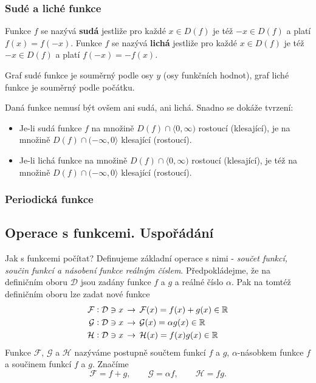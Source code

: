       \subsubsection{Sudé a liché funkce}
        \begin{definition}\label{MA1:def_lim04}
          Funkce $f$ se nazývá \textbf{sudá} jestliže pro každé $x\in D(f)$ je též $-x\in D(f)$  a 
          platí $f(x)=f(-x)$.
          Funkce $f$ se nazývá \textbf{lichá} jestliže pro každé $x\in D(f)$ je též $-x\in D(f)$  a 
          platí $f(-x)=-f(x)$. 
        \end{definition}
        Graf sudé funkce je souměrný podle osy $y$ (osy funkčních hodnot), graf liché funkce je  
        souměrný podle počátku. 
 
         

        Daná funkce nemusí být ovšem ani sudá, ani lichá. Snadno se dokáže tvrzení:
        \begin{itemize}[noitemsep]
          \item Je-li sudá funkce $f$ na množině $D(f)\cap\langle0,\infty)$ rostoucí (klesající),
                je na množině $D(f)\cap(-\infty,0\rangle$ klesající (rostoucí).
          \item Je-li lichá funkce na množině $D(f)\cap\langle0,\infty)$ rostoucí (klesající),
                je též na množině $D(f)\cap(-\infty,0\rangle$ klesající (rostoucí).                 
        \end{itemize}
      \subsubsection{Periodická funkce}

    \subsection{Operace s funkcemi. Uspořádání}\label{mai:IchapIIIsecIssecIV}
      Jak s funkcemi počítat? Definujeme základní operace s nimi - \emph{součet funkcí, součin 
      funkcí a násobení funkce reálným číslem}. Předpokládejme, že na definičním oboru 
      \(\mathcal{D}\) jsou zadány funkce \(f\) a \(g\) a reálné číslo \(\alpha\). Pak na tomtéž 
      definičním oboru lze zadat nové funkce
      \begin{align*}
        \mathcal{F} &: \mathcal{D}\ni x\,\rightarrow\,\mathcal{F}(x) = f(x)+g(x)  \in\mathbb{R}   \\
        \mathcal{G} &: \mathcal{D}\ni x\,\rightarrow\,\mathcal{G}(x) = \alpha g(x)\in\mathbb{R}   \\
        \mathcal{H} &: \mathcal{D}\ni x\,\rightarrow\,\mathcal{H}(x) = f(x) g(x)  \in\mathbb{R} 
      \end{align*}
      Funkce \(\mathcal{F}\), \(\mathcal{G}\) a \(\mathcal{H}\) nazýváme postupně součtem funkcí 
      \(f\) a \(g\), \(\alpha\)-násobkem funkce \(f\) a součinem funkcí \(f\) a \(g\). Značíme
      \begin{equation*}
       \mathcal{F} = f + g, \qquad \mathcal{G} = \alpha f, \qquad \mathcal{H} = fg. 
      \end{equation*}
      
